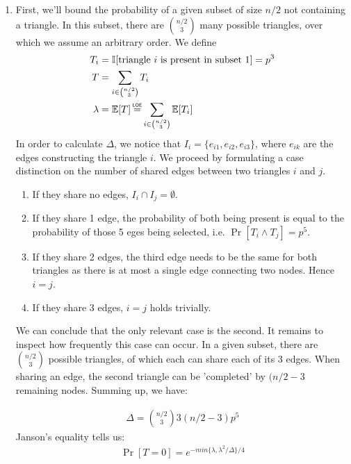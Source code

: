 \documentclass[a4paper,german]{article}
\newcommand\loe{\mathrel{\overset{\makebox[0pt]{\mbox{\normalfont\tiny\sffamily LOE}}}{=}}}
\newcommand{\E}{\mathbb{E}}
\begin{document}
\begin{enumerate}
\item
First, we'll bound the probability of a given subset of size \(n/2\) not containing a triangle. In this subset, there are \( {n/2 \choose 3}\) many possible triangles, over which we assume an arbitrary order. We define 
\begin{align*} 
T_i &= \mathbb{I} [\text{triangle } i \text{ is present in subset } 1] = p^3 \\
T &= \sum_{i \in {n/2 \choose 3}} T_i \\
\lambda &= \E[T] \loe \sum_{i \in {n/2 \choose 3}} \E[T_i]
\end{align*}
In order to calculate \(\Delta\), we notice that \(I_i = \{e_{i1}, e_{i2}, e_{i3} \}\), where \(e_{ik}\) are the edges constructing the triangle \(i\). We proceed by formulating a case distinction on the number of shared edges between two triangles \(i\) and \(j\).
\begin{enumerate}
\item If  they share no edges, \(I_i \cap I_j = \emptyset \).
\item If they share 1 edge, the probability of both being present is equal to the probability of those 5 eges being selected, i.e. \(\Pr[T_i \wedge T_j] = p^5\).
\item If they share 2 edges, the third edge needs to be the same for both triangles as there is at most a single edge connecting two nodes. Hence \(i = j\).
\item If they share 3 edges, \(i = j\) holds trivially. 
\end{enumerate}
We can conclude that the only relevant case is the second. It remains to inspect how frequently this case can occur. In a given subset, there are \( {n/2 \choose 3} \) possible triangles, of which each can share each of its 3 edges. When sharing an edge, the second triangle can be 'completed' by \( (n/2 -3\) remaining nodes. Summing up, we have:

\begin{align*}
\Delta = {n/2 \choose 3}3(n/2 -3) p^5
\end{align*}
Janson's equality tells us:
\begin{align*}
\Pr[T = 0] = e^{- min\{\lambda, \lambda^2 / \Delta\} /4} 
\end{align*}


\end{enumerate}
\end{document}
